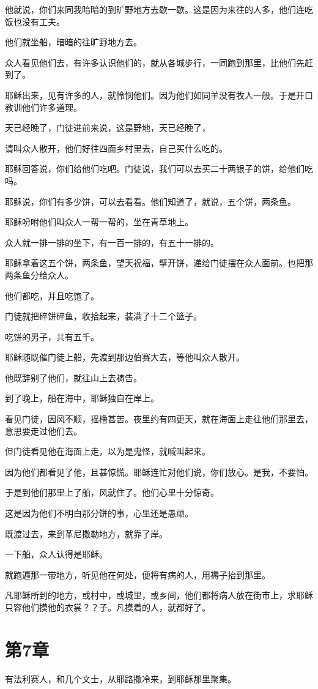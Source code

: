 \documentclass[12pt,oneside]{book}
\begin{document}
他就说，你们来同我暗暗的到旷野地方去歇一歇。这是因为来往的人多，他们连吃饭也没有工夫。

他们就坐船，暗暗的往旷野地方去。

众人看见他们去，有许多认识他们的，就从各城步行，一同跑到那里，比他们先赶到了。

耶稣出来，见有许多的人，就怜悯他们。因为他们如同羊没有牧人一般。于是开口教训他们许多道理。

天已经晚了，门徒进前来说，这是野地，天已经晚了，

请叫众人散开，他们好往四面乡村里去，自己买什么吃的。

耶稣回答说，你们给他们吃吧。门徒说，我们可以去买二十两银子的饼，给他们吃吗。

耶稣说，你们有多少饼，可以去看看。他们知道了，就说，五个饼，两条鱼。

耶稣吩咐他们叫众人一帮一帮的，坐在青草地上。

众人就一排一排的坐下，有一百一排的，有五十一排的。

耶稣拿着这五个饼，两条鱼，望天祝福，擘开饼，递给门徒摆在众人面前。也把那两条鱼分给众人。

他们都吃，并且吃饱了。

门徒就把碎饼碎鱼，收拾起来，装满了十二个篮子。

吃饼的男子，共有五千。

耶稣随既催门徒上船，先渡到那边伯赛大去，等他叫众人散开。

他既辞别了他们，就往山上去祷告。

到了晚上，船在海中，耶稣独自在岸上。

看见门徒，因风不顺，摇橹甚苦。夜里约有四更天，就在海面上走往他们那里去，意思要走过他们去。

但门徒看见他在海面上走，以为是鬼怪，就喊叫起来。

因为他们都看见了他，且甚惊慌。耶稣连忙对他们说，你们放心。是我，不要怕。

于是到他们那里上了船，风就住了。他们心里十分惊奇。

这是因为他们不明白那分饼的事，心里还是愚顽。

既渡过去，来到革尼撒勒地方，就靠了岸。

一下船，众人认得是耶稣。

就跑遍那一带地方，听见他在何处，便将有病的人，用褥子抬到那里。

凡耶稣所到的地方，或村中，或城里，或乡间，他们都将病人放在街市上，求耶稣只容他们摸他的衣裳？？子。凡摸着的人，就都好了。

\chapter{第7章}
有法利赛人，和几个文士，从耶路撒冷来，到耶稣那里聚集。
\end{document}
